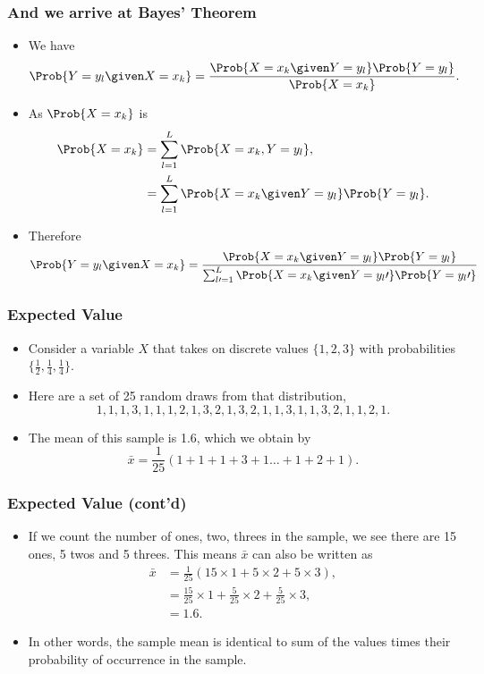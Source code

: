 \documentclass[10pt,xcolor=dvipsnames,serif,professionalfont]{beamer} %
\begin{document}
\begin{frame}
\frametitle{And we arrive at Bayes' Theorem}
\begin{itemize}
\item We have
\begin{align}
\Prob{Y=y_l \given X=x_k} &= \frac{\Prob{X=x_k\given Y=y_l}\Prob{Y=y_l}}{\Prob{X=x_k}}.
\end{align}
\item As $\Prob{X=x_k}$ is
\begin{align}
\Prob{X=x_k} &= \sum_{l=1}^L \Prob{X=x_k, Y=y_l },\\
 &= \sum_{l=1}^L \Prob{X=x_k \given Y=y_l }\Prob{Y=y_l}.
\end{align}
\item Therefore
\begin{equation}
\Prob{Y=y_l \given X=x_k} = \frac{\Prob{X=x_k\given Y=y_l}\Prob{Y=y_l}}{\sum_{l\prime=1}^L \Prob{X=x_k  \given Y=y_l\prime}\Prob{Y=y_l\prime}}
\end{equation}
\end{itemize}
\end{frame}

\begin{frame}
\frametitle{Expected Value}
\begin{itemize}
\item Consider a variable $X$ that takes on discrete values $\{1,2,3\}$ with probabilities $\{\frac{1}{2},\frac{1}{4}, \frac{1}{4}\}$. 
\item Here are a set of 25 random draws from that distribution,
\[
1, 1, 1, 3, 1, 1, 1, 2, 1, 3, 2, 1, 3, 2, 1, 1, 3, 1, 1, 3, 2, 1, 1, 2, 1.
\]
\item The mean of this sample is 1.6, which we obtain by 
\[
\bar{x} = \frac{1}{25} (1 + 1 +1 + 3 + 1 \ldots + 1 +2 +1).
\]
\end{itemize}
\end{frame}


\begin{frame}
\frametitle{Expected Value (cont'd)}
\begin{itemize}
\item If we count the number of ones, two, threes in the sample, we see there are 15 ones, 5 twos and 5 threes. This means $\bar{x}$ can also be written as 
\begin{align}
\bar{x} &= \frac{1}{25} (15\times 1  + 5\times 2 + 5\times 3),\\
&= \frac{15}{25} \times 1 + \frac{5}{25} \times 2 + \frac{5}{25} \times 3,\\
&= 1.6. 
\end{align}
\item In other words, the sample mean is identical to sum of the values times their probability of occurrence in the sample. 
\end{itemize}
\end{frame}
\end{document}
